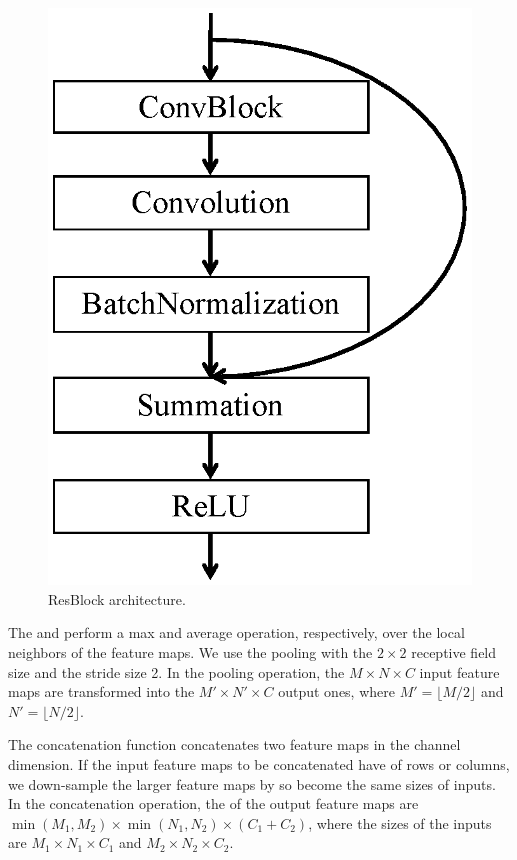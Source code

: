\begin{figure}[t]
\includegraphics[scale=0.45]{images/resblock.eps}
\caption{ResBlock architecture.}
\label{resblock}
\end{figure}

The  and  perform a max and average operation, respectively, over the local neighbors of the feature maps. We use the pooling with the $2 \times 2$ receptive field size and the stride size 2.
In the pooling operation, the $M \times N \times C$ input feature maps are transformed into the $M' \times N' \times C$ output ones, where $M' = \lfloor M/2 \rfloor$ and $N' = \lfloor N/2 \rfloor$.

The concatenation function concatenates two feature maps in the channel dimension.
If the input feature maps to be concatenated have   of rows or columns, we down-sample the larger feature maps by  so  become the same sizes of  inputs.
In the concatenation operation, the  of the output feature maps are $\min (M_1, M_2) \times \min (N_1, N_2) \times (C_1 + C_2)$, where  the sizes of the inputs are $M_1 \times N_1 \times C_1$ and $M_2 \times N_2 \times C_2$.

